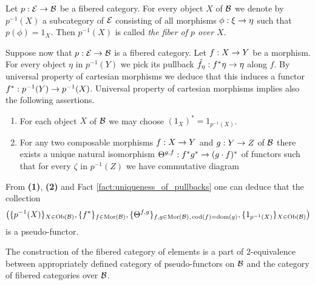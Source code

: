 \begin{definition}
Let $p:{\mathcal E}\rightarrow {\mathcal B}$ be a fibered category. For every object $X$ of ${\mathcal B}$ we denote by $p^{-1}(X)$ a subcategory of ${\mathcal E}$ consisting of all morphisms $\phi:\xi\rightarrow \eta$ such that $p(\phi) = 1_X$. Then $p^{-1}(X)$ is called \textit{the fiber of $p$ over $X$}.
\end{definition}
\noindent
Suppose now that $p:{\mathcal E}\rightarrow {\mathcal B}$ is a fibered category. Let $f:X\rightarrow Y$ be a morphism. For every object $\eta$ in $p^{-1}(Y)$ we pick its pullback $\tilde{f}_{\eta}:f^*\eta\rightarrow \eta$ along $f$. By universal property of cartesian morphisms we deduce that this induces a functor $f^*:p^{-1}(Y)\rightarrow p^{-1}(X)$. Universal property of cartesian morphisms implies also the following assertions.
\begin{enumerate}[label=\textbf{(\arabic*)}, leftmargin=3.0em]
\item For each object $X$ of ${\mathcal B}$ we may choose $(1_X)^* = 1_{p^{-1}(X)}$.
\item For any two composable morphisms $f:X\rightarrow Y$ and $g:Y\rightarrow Z$ of ${\mathcal B}$ there exists a unique natural isomorphism $\Theta^{g,f}: f^*g^* \rightarrow (g\cdot f)^*$ of functors such that for every $\zeta$ in $p^{-1}(Z)$ we have commutative diagram
\begin{center}
\end{center}
\end{enumerate}
From \textbf{(1)}, \textbf{(2)} and Fact \ref{fact:uniqueness_of_pullbacks} one can deduce that the collection
$$\big(\{p^{-1}(X)\}_{X\in \mathrm{Ob}({\mathcal B})},\{f^*\}_{f\in \mathrm{Mor}({\mathcal B})},\{\Theta^{f,g}\}_{f,g\in \mathrm{Mor}({\mathcal B}),\,\mathrm{cod}(f)=\mathrm{dom}(g)},\{1_{p^{-1}(X)}\}_{X\in \mathrm{Ob}({\mathcal B})}\big)$$
is a pseudo-functor.

\begin{remark}\label{remark:fibered_categories_and_pseudo_functors}
The construction of the fibered category of elements is a part of $2$-equivalence between appropriately defined category of pseudo-functors on ${\mathcal B}$ and the category of fibered categories over ${\mathcal B}$.
\end{remark}

